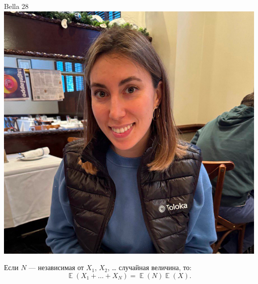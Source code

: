 \documentclass[12pt]{article}
\DeclareMathOperator{\E}{\mathbb{E}}
\begin{document}
\begin{minipage}{0.45\textwidth}
\begin{tinderf}{Bella 28}
\includegraphics[width=\textwidth]{tinder-photo/bella.jpeg}

  

\begin{mybox}
Если $N$ — независимая от $X_1$, $X_2$, \ldots{ } случайная величина, то: 
\[
\E(X_1 + \ldots + X_N)= \E(N)\E(X).
\]
\end{mybox}
\end{tinderf}
\end{minipage}
%
%
\end{document}
